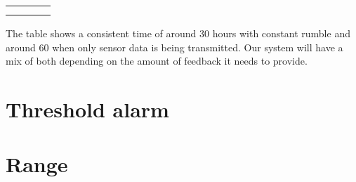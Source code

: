 \begin{table}[h]
\begin{tabular}{|p{3cm}|p{3cm}|p{3cm}|p{3cm}|}
\hline
& & & \\ \hline
& & & \\ \hline
& & & \\ \hline
\end{tabular}

The table shows a consistent time of around 30 hours with constant rumble and around 60 when only sensor data is being transmitted. Our system will have a mix of both depending on the amount of feedback it needs to provide.
\end{table}

\section{Threshold alarm}


\section{Range}
